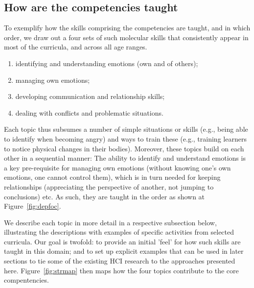 \documentclass[prodmode,acmtochi]{acmsmall}
\begin{document}
\subsection{How are the competencies taught}
To exemplify how the skills comprising the competencies are taught, and in which order, we draw out a four sets of such molecular skills that consistently appear in most of the curricula, and across all age ranges. 


\begin{enumerate}
        \item identifying and understanding emotions (own and of others);
        \item managing own emotions;
        \item developing communication and relationship skills;
        \item dealing with conflicts and problematic situations.
\end{enumerate}
 
Each topic thus subsumes a number of simple situations or skills (e.g., being able to identify when becoming angry) and ways to train these (e.g., training learners to notice physical changes in their bodies).
Moreover, these topics build on each other in a sequential manner: The ability to identify and understand emotions is a key pre-requisite for managing own emotions (without knowing one's own emotions, one cannot control them), which is in turn needed for keeping relationships (appreciating the perspective of another, not jumping to conclusions) etc. As such, they are taught in the order as shown at Figure~\ref{fig:depfoc}. 
%

We describe each topic in more detail in a respective subsection below, illustrating the descriptions with examples of specific activities from selected curricula. Our goal is twofold: to provide an initial 'feel' for how such skills are taught in this domain; and to set up explicit examples that can be used in later sections to tie some of the existing HCI research to the approaches presented here. Figure~\ref{fig:strmap} then maps how the four topics contribute to the core compentencies. 
\end{document}
